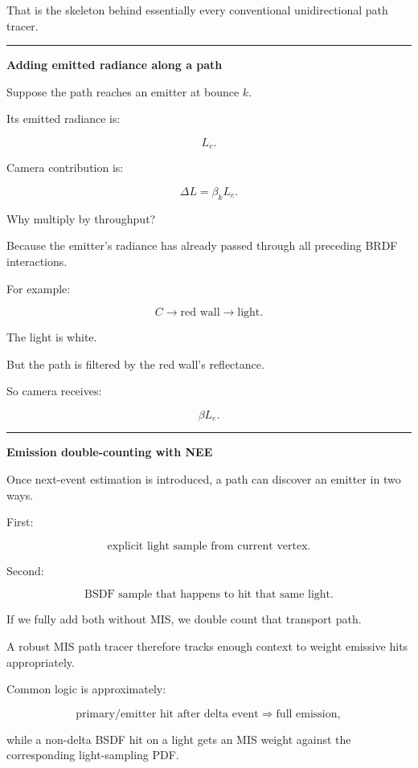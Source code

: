 That is the skeleton behind essentially every conventional unidirectional path tracer.

\begin{center}\rule{0.5\linewidth}{0.5pt}\end{center}

\textbf{Adding emitted radiance along a path}

Suppose the path reaches an emitter at bounce \(k\).

Its emitted radiance is:

\[
L_e.
\]

Camera contribution is:

\[
\boxed{
\Delta L
=
\beta_kL_e.
}
\]

Why multiply by throughput?

Because the emitter's radiance has already passed through all preceding BRDF interactions.

For example:

\[
C\rightarrow\text{red wall}\rightarrow\text{light}.
\]

The light is white.

But the path is filtered by the red wall's reflectance.

So camera receives:

\[
\beta L_e.
\]

\begin{center}\rule{0.5\linewidth}{0.5pt}\end{center}

\textbf{Emission double-counting with NEE}

Once next-event estimation is introduced, a path can discover an emitter in two ways.

First:

\[
\text{explicit light sample from current vertex}.
\]

Second:

\[
\text{BSDF sample that happens to hit that same light}.
\]

If we fully add both without MIS, we double count that transport path.

A robust MIS path tracer therefore tracks enough context to weight emissive hits appropriately.

Common logic is approximately:

\[
\text{primary/emitter hit after delta event}
\Rightarrow
\text{full emission},
\]

while a non-delta BSDF hit on a light gets an MIS weight against the corresponding light-sampling PDF.

